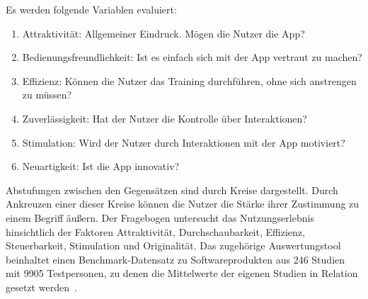 Es werden folgende Variablen evaluiert: 
\begin{enumerate}
    \item Attraktivität: Allgemeiner Eindruck. Mögen die Nutzer die App?
    \item Bedienungsfreundlichkeit: Ist es einfach sich mit der App vertraut zu machen?
    \item Effizienz: Können die Nutzer das Training durchführen, ohne sich anstrengen zu müssen?
    \item Zuverlässigkeit: Hat der Nutzer die Kontrolle über Interaktionen?
    \item Stimulation: Wird der Nutzer durch Interaktionen mit der App motiviert?
    \item Neuartigkeit: Ist die App innovativ?
\end{enumerate}
 Abstufungen zwischen den Gegensätzen sind durch Kreise dargestellt. Durch Ankreuzen einer dieser Kreise können die Nutzer die Stärke ihrer Zustimmung zu einem Begriff äußern. 
Der Fragebogen untersucht das Nutzungserlebnis hinsichtlich der Faktoren Attraktivität, Durchschaubarkeit, Effizienz, Steuerbarkeit, Stimulation und Originalität. Das zugehörige Auswertungstool beinhaltet einen Benchmark-Datensatz zu Softwareprodukten aus 246 Studien mit 9905 Testpersonen, zu denen die Mittelwerte der eigenen Studien in Relation gesetzt werden~\cite{ueqpublication}.

